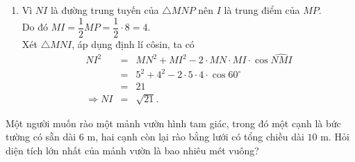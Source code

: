 \begin{bt}[1,5 điểm]
{\begin{enumerate}
			Mà $S_{\triangle MNP} = pr \Rightarrow r = \dfrac{S_{\triangle MNP}}{p} = \dfrac{10\sqrt{3}}{10} = \sqrt{3}$.\\
			Vậy bán kính đường tròn nội tiếp tam giác $MNP$ bằng $\sqrt{3}$.
			\item Vì $NI$ là đường trung tuyến của $\triangle MNP$ nên $I$ là trung điểm của $MP$.\\
			Do đó $MI = \dfrac{1}{2}MP = \dfrac{1}{2}\cdot 8 = 4$.\\
			Xét $\triangle MNI$, áp dụng định lí côsin, ta có
			\begin{eqnarray*}
				NI^2 &=& MN^2 + MI^2 - 2\cdot MN\cdot MI\cdot\cos\widehat{NMI}\\
				&=& 5^2 + 4^2 - 2\cdot 5\cdot 4\cdot \cos 60^\circ\\
				&=& 21\\
				\Rightarrow NI &=& \sqrt{21}.
			\end{eqnarray*}
		\end{enumerate}
	}
\end{bt}

\begin{bt}%
	Một người muốn rào một mảnh vườn hình tam giác, trong đó một cạnh là bức tường có sẵn dài $6\text{ m}$, hai cạnh còn lại rào bằng lưới có tổng chiều dài $10\text{ m}$. Hỏi diện tích lớn nhất của mảnh vườn là bao nhiêu mét vuông?
\end{bt}

